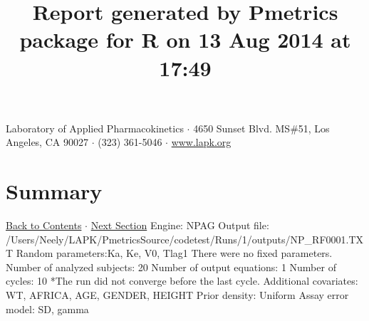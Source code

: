 \documentclass{article}
\title{Report generated by Pmetrics package for R on 13 Aug 2014 at 17:49 }
\date{}
\begin{document}
              \maketitle 
Laboratory of Applied Pharmacokinetics $\cdot$ 4650 Sunset Blvd. MS\#51, Los Angeles, CA 90027 $\cdot$ (323) 361-5046 $\cdot$ \href{http://www.lapk.org}{www.lapk.org} 
\hypertarget{tableofcontents}{}
        \tableofcontents
        \newpage 
\section{Summary} \hyperlink{tableofcontents}{Back to Contents} $\cdot$ \hyperlink{cycleinfo}{Next Section}\newline
 \newline 
Engine: NPAG\newline 
Output file: /Users/Neely/LAPK/PmetricsSource/codetest/Runs/1/outputs/NP\_RF0001.TXT\newline 
Random parameters:Ka, Ke, V0, Tlag1\newline 
There were no fixed parameters. \newline 
Number of analyzed subjects:  20 \newline 
Number of output equations:  1 \newline 
Number of cycles:  10     *The run did not converge before the last cycle. \newline 
Additional covariates:  WT, AFRICA, AGE, GENDER, HEIGHT \newline 
Prior density: Uniform \newline Assay error model: SD, gamma \newline  \newline 
\newpage
            \hypertarget{cycleinfo}{}
            
\end{document}
